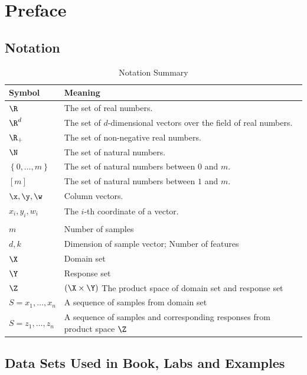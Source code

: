 \section{Preface}

\subsection{Notation}

\begin{table}[h!]
	\begin{center}
		\caption{Notation Summary}
		\label{tab:notation}
		\begin{tabular}{l|l}
			\textbf{Symbol} & \textbf{Meaning} \\
			\hline
			$\R$ & The set of real numbers. \\
			$\R^d$ & The set of $d$-dimensional vectors over the field of real numbers. \\
			$\R_+$ & The set of non-negative real numbers. \\
			$\N$ & The set of natural numbers. \\
			$\left\{0,\ldots,m\right\}$ & The set of natural numbers between $0$ and $m$. \\
			$\left[m\right]$ & The set of natural numbers between $1$ and $m$. \\
			$\x,\y,\w$ & Column vectors. \\
			$x_i,y_i,w_i$ & The $i$-th coordinate of a vector. \\
			\\
			\hline
			$m$ & Number of samples \\
			$d, k$ & Dimension of sample vector; Number of features \\
			$\X$ & Domain set \\
			$\Y$ & Response set \\
			$\Z$ & $\left(\X\times\Y\right)$ The product space of domain set and response set\\
			$S=x_1,\ldots,x_n$ & A sequence of samples from domain set \\
			$S=z_1,\ldots,z_n$ & A sequence of samples and corresponding responses from product space $\Z$ \\
		\end{tabular}
	\end{center}
\end{table}


\subsection{Data Sets Used in Book, Labs and Examples}
